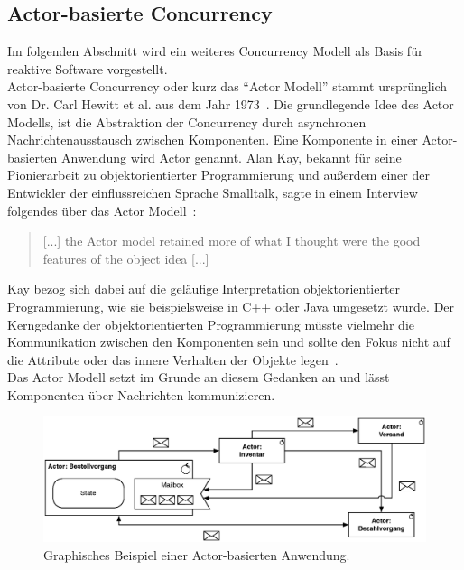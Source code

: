 \subsection{Actor-basierte Concurrency}\label{subsec:actor-model}
Im folgenden Abschnitt wird ein weiteres Concurrency Modell als Basis für reaktive Software vorgestellt.\\
Actor-basierte Concurrency oder kurz das \enquote{Actor Modell} stammt ursprünglich von Dr. Carl Hewitt et al. aus dem Jahr 1973~\cite{hewitt_universal_1973}. Die grundlegende Idee des Actor Modells, ist die Abstraktion der Concurrency durch asynchronen Nachrichtenausstausch zwischen Komponenten. Eine Komponente in einer Actor-basierten Anwendung wird Actor genannt. Alan Kay, bekannt für seine Pionierarbeit zu objektorientierter Programmierung und außerdem einer der Entwickler der einflussreichen Sprache Smalltalk, sagte in einem Interview folgendes über das Actor Modell~\cite{binstock_interview_2012}:

\begin{quotation}
[...] the Actor model retained more of what I thought were the good features of the object idea [...]
\end{quotation}

Kay bezog sich dabei auf die geläufige Interpretation objektorientierter Programmierung, wie sie beispielsweise in C++ oder Java umgesetzt wurde. Der Kerngedanke der objektorientierten Programmierung müsste vielmehr die Kommunikation zwischen den Komponenten sein und sollte den Fokus nicht auf die Attribute oder das innere Verhalten der Objekte legen~\cite[S.~10]{vernon_reactive_2016}.\\
Das Actor Modell setzt im Grunde an diesem Gedanken an und lässt Komponenten über Nachrichten kommunizieren. 

\begin{figure}[H]
 \centering
 \includegraphics[width=1.0\textwidth]{4-Hauptteil/actor-model/actor-model.eps}
 \caption{Graphisches Beispiel einer Actor-basierten Anwendung.}
 \label{fig:actor-model}
\end{figure}

